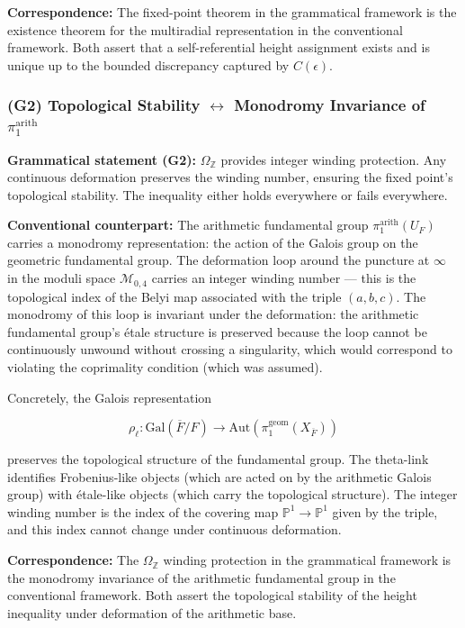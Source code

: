 \documentclass[12pt,a4paper]{article}
\begin{document}
\textbf{Correspondence:} The fixed-point theorem in the grammatical framework is the existence theorem for the multiradial representation in the conventional framework. Both assert that a self-referential height assignment exists and is unique up to the bounded discrepancy captured by $C(\epsilon)$.

\subsubsection{(G2) Topological Stability $\leftrightarrow$ Monodromy Invariance of $\pi_1^{\text{arith}}$}

\textbf{Grammatical statement (G2):} $\Omega_\mathbb{Z}$ provides integer winding protection. Any continuous deformation preserves the winding number, ensuring the fixed point's topological stability. The inequality either holds everywhere or fails everywhere.

\textbf{Conventional counterpart:} The arithmetic fundamental group $\pi_1^{\text{arith}}(U_F)$ carries a monodromy representation: the action of the Galois group on the geometric fundamental group. The deformation loop around the puncture at $\infty$ in the moduli space $\mathcal{M}_{0,4}$ carries an integer winding number --- this is the topological index of the Belyi map associated with the triple $(a, b, c)$. The monodromy of this loop is invariant under the deformation: the arithmetic fundamental group's étale structure is preserved because the loop cannot be continuously unwound without crossing a singularity, which would correspond to violating the coprimality condition (which was assumed).

Concretely, the Galois representation

\[\rho_{\ell}: \text{Gal}(\overline{F}/F) \to \text{Aut}(\pi_1^{\text{geom}}(X_{\overline{F}}))\]

preserves the topological structure of the fundamental group. The theta-link identifies Frobenius-like objects (which are acted on by the arithmetic Galois group) with étale-like objects (which carry the topological structure). The integer winding number is the index of the covering map $\mathbb{P}^1 \to \mathbb{P}^1$ given by the triple, and this index cannot change under continuous deformation.

\textbf{Correspondence:} The $\Omega_\mathbb{Z}$ winding protection in the grammatical framework is the monodromy invariance of the arithmetic fundamental group in the conventional framework. Both assert the topological stability of the height inequality under deformation of the arithmetic base.
\end{document}
